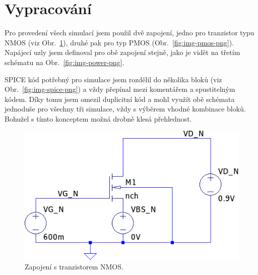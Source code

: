 \documentclass{protokol}
\begin{document}
	\maketitle

\section{Vypracování}
  Pro provedení všech simulací jsem použil dvě zapojení, jedno pro tranzistor typu NMOS (viz Obr.~\ref{fig:img-nmos-png}), druhé pak pro typ PMOS (Obr.~\ref{fig:img-pmos-png}). Napájecí uzly jsem definoval pro obě zapojení stejně, jako je vidět na třetím schématu na Obr.~\ref{fig:img-power-png}.

  SPICE kód potřebný pro simulace jsem rozdělil do několika bloků (viz Obr.~\ref{fig:img-spice-png}) a vždy přepínal mezi komentářem a spustitelným kódem. Díky tomu jsem omezil duplicitní kód a mohl využít obě schémata jednoduše pro všechny tři simulace, vždy s výběrem vhodné kombinace bloků. Bohužel s tímto konceptem možná drobně klesá přehlednost.

  \begin{figure}[h!]
    \centering
    \includegraphics[scale=1]{img/nmos.png}
    \caption{Zapojení s tranzistorem NMOS.}
    \label{fig:img-nmos-png}
  \end{figure}
\end{document}
